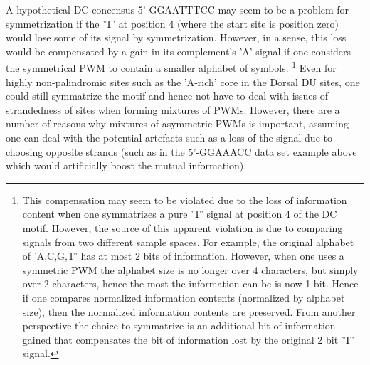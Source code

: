 A hypothetical DC concensus 5'-GGAATTTCC may seem to be a problem for symmetrization if the 'T' at position 4 (where the start site is position zero) would lose some of its signal by symmetrization.  However, in a sense, this loss would be compensated by a gain in its complement's 'A' signal if one considers the symmetrical PWM to contain a smaller alphabet of symbols.  \footnote{This compensation may seem to be violated due to the loss of information content when one symmatrizes a pure 'T' signal at position 4 of the DC motif.  However, the source of this apparent violation is due to comparing signals from two different sample spaces.  For example, the original alphabet of 'A,C,G,T' has at most 2 bits of information.  However, when one uses a symmetric PWM the alphabet size is no longer over 4 characters, but simply over 2 characters, hence the most the information can be is now 1 bit.  Hence if one compares normalized information contents (normalized by alphabet size), then the normalized information contents are preserved.  From another perspective the choice to symmatrize is an additional bit of information gained that compensates the bit of information lost by the original 2 bit 'T' signal.}   Even for highly non-palindromic sites such as the 'A-rich' core in the Dorsal DU sites, one could still symmatrize the motif and hence not have to deal with issues of strandedness of sites when forming mixtures of PWMs.  However, there are a number of reasons why mixtures of asymmetric PWMs is important, assuming one can deal with the potential artefacts such as a loss of the  signal due to choosing opposite strands (such as in the 5'-GGAAACC data set example above which would artificially boost the mutual information). 

